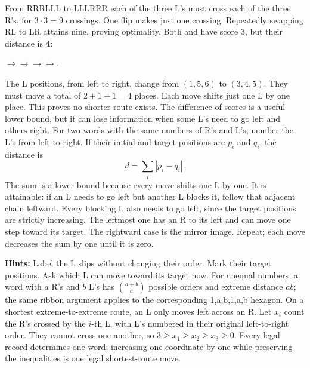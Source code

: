 \documentclass[11pt]{article}
\begin{document}
From RRRLLL to LLLRRR each of the three L's must cross each of the three R's, for \(3\cdot3=9\) crossings. One flip makes just one crossing. Repeatedly swapping RL to LR attains nine, proving optimality.
Both  and  have score 3, but their distance is \textbf{4}:
\begin{center}\small{}\(\to\)\(\to\)\(\to\)\(\to\).\end{center}
The L positions, from left to right, change from \((1,5,6)\) to \((3,4,5)\). They must move a total of \(2+1+1=4\) places. Each move shifts just one L by one place. This proves no shorter route exists. The difference of scores is a useful lower bound, but it can lose information when some L's need to go left and others right.
For two words with the same numbers of R's and L's, number the L's from left to right. If their initial and target positions are \(p_i\) and \(q_i\), the distance is
\[d=\sum_i |p_i-q_i|.\]
The sum is a lower bound because every move shifts one L by one. It is attainable: if an L needs to go left but another L blocks it, follow that adjacent chain leftward. Every blocking L also needs to go left, since the target positions are strictly increasing. The leftmost one has an R to its left and can move one step toward its target. The rightward case is the mirror image. Repeat; each move decreases the sum by one until it is zero.

\textbf{Hints:} Label the L slips without changing their order. Mark their target positions. Ask which L can move toward its target now. For unequal numbers, a word with \(a\) R's and \(b\) L's has \(\binom{a+b}{a}\) possible orders and extreme distance \(ab\); the same ribbon argument applies to the corresponding 1,a,b,1,a,b hexagon.
\newpage
{}
On a shortest extreme-to-extreme route, an L only moves left across an R. Let \(x_i\) count the R's crossed by the \(i\)-th L, with L's numbered in their original left-to-right order. They cannot cross one another, so \(3\ge x_1\ge x_2\ge x_3\ge0\). Every legal record determines one word; increasing one coordinate by one while preserving the inequalities is one legal shortest-route move.
\end{document}
